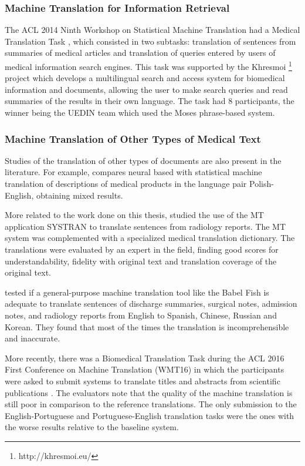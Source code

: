 \subsubsection{Machine Translation for Information Retrieval}

The ACL 2014 Ninth Workshop on Statistical Machine Translation had a Medical Translation Task \citep{Bojar2014}, which consisted in two subtasks: translation of sentences from summaries of medical articles and translation of queries entered by users of medical information search engines. This task was supported by the Khresmoi \footnote{http://khresmoi.eu/} project which develops a multilingual search and access system for biomedical information and documents, allowing the user to make search queries and read summaries of the results in their own language. The task had 8 participants, the winner being the UEDIN team \citep{Durrani2014} which used the Moses phrase-based system. 

\subsubsection{Machine Translation of Other Types of Medical Text}

Studies of the translation of other types of documents are also present in the literature. For example, \citep{Wok2015} compares neural based with statistical machine translation of descriptions of medical products in the language pair Polish-English, obtaining mixed results.

More related to the work done on this thesis, \citep{Castilla2007a} studied the use of the MT application SYSTRAN to translate sentences from radiology reports. The MT system was complemented with a specialized medical translation dictionary. The translations were evaluated by an expert in the field, finding good scores for understandability, fidelity with original text and translation coverage of the original text. 

\citep{Zeng-Treitler2010} tested if a general-purpose machine translation tool like the Babel Fish is adequate to translate sentences of discharge summaries, surgical notes, admission notes, and radiology reports from English to Spanish, Chinese, Russian and Korean. They found that most of the times the translation is incomprehensible and inaccurate.

More recently, there was a Biomedical Translation Task during the ACL 2016 First Conference on Machine Translation (WMT16) in which the participants were asked to submit systems to translate titles and abstracts from scientific publications \citep{Bojar2016}. The evaluators note that the quality of the machine translation is still poor in comparison to the reference translations. The only submission to the English-Portuguese  and Portuguese-English translation tasks \citep{Aires2016} were the ones with the worse results relative to the baseline system. 

